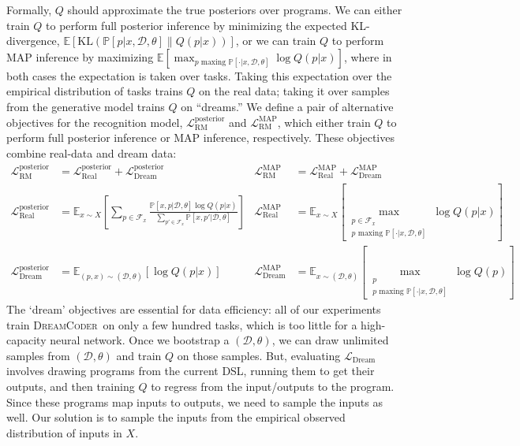 \documentclass{article}
\newcommand{\system}{\textsc{DreamCoder}~}
\newcommand{\expect}{\mathds{E}} %
\newcommand{\probability}{\mathds{P}} %
\begin{document}
Formally, $Q$ should approximate the true posteriors over programs.
We can either train $Q$ to perform full posterior inference by minimizing the expected KL-divergence, $  \expect\left[\text{KL}\left(\probability[p|x,\mathcal{D},\theta]\|Q(p|x) \right) \right]$,
or we can train $Q$ to perform MAP inference
by maximizing $\expect\left[\max_{p\text{ maxing }\probability[\cdot |x,\mathcal{D},\theta]} \log Q(p|x) \right]$,
where in both cases the expectation is taken over tasks. Taking this expectation over the empirical distribution of tasks trains $Q$ on the real data; taking it over samples from the generative model trains $Q$ on ``dreams.''
We define a pair of alternative objectives for the recognition model,
$\mathcal{L}_{\text{RM}}^{\text{posterior}}$ and $\mathcal{L}_{\text{RM}}^{\text{MAP}}$,
which either train $Q$ to perform full posterior inference or MAP inference, respectively.
These objectives combine real-data and dream data:
\begin{align*}
  \mathcal{L}_{\text{RM}}^{\text{posterior}} &= \mathcal{L}_{\text{Real}}^{\text{posterior}} + \mathcal{L}_{\text{Dream}}^{\text{posterior}}&
  \mathcal{L}_{\text{RM}}^{\text{MAP}} &= \mathcal{L}_{\text{Real}}^{\text{MAP}} + \mathcal{L}_{\text{Dream}}^{\text{MAP}}\\
  \mathcal{L}_{\text{Real}}^{\text{posterior}}& = \expect_{x\sim X}\left[\sum_{p\in \mathcal{F}_x}
    \frac{\probability\left[x,p|\mathcal{D},\theta \right]\log Q(p|x)}{\sum_{p'\in \mathcal{F}_x}\probability\left[x,p'|\mathcal{D},\theta \right]}\right] &
\mathcal{L}_{\text{Real}}^{\text{MAP}}& = \expect_{x\sim X}\left[\max_{\substack{p\in \mathcal{F}_x\\p\text{ maxing }\probability[\cdot |x,\mathcal{D},\theta]}} \log Q(p|x) \right]  \\
  \mathcal{L}_{\text{Dream}}^{\text{posterior}} &= \expect_{(p,x)\sim(\mathcal{D},\theta) }\left[\log Q(p|x)\right]&
    \mathcal{L}_{\text{Dream}}^{\text{MAP}} &= \expect_{x\sim(\mathcal{D},\theta) }\left[\max_{\substack{p\\p\text{ maxing }\probability[\cdot |x,\mathcal{D},\theta]}}\log Q(p)\right]
\end{align*}
  The `dream' objectives are essential for data efficiency:
all of our experiments train \system on only a few hundred tasks, which is too little for
a high-capacity neural network.
Once we bootstrap a $(\mathcal{D},\theta)$,
we can draw unlimited samples from $(\mathcal{D},\theta)$
and train $Q$ on those samples.
But, evaluating $\mathcal{L}_{\text{Dream}}$ involves drawing programs from
the current DSL, running them to get their outputs,
and then training $Q$ to regress from the input/outputs to the program.
Since these programs map inputs to outputs,
we need to sample the inputs as well.
Our solution is to sample the inputs
from the empirical observed distribution of inputs in $X$.
\end{document}
